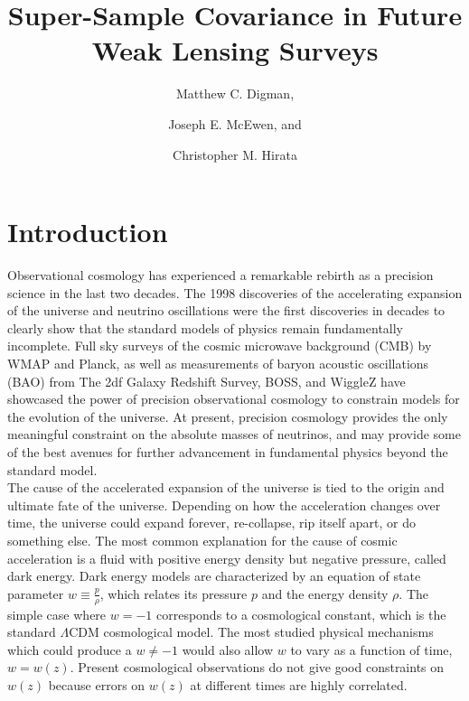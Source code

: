 \documentclass[a4paper,11pt]{article}
\title{\boldmath Super-Sample Covariance in Future Weak Lensing Surveys}
\author{Matthew C. Digman,}
\author{Joseph E. McEwen, and}
\author{Christopher M. Hirata}
\affiliation{Center for Cosmology and AstroParticle Physics, Department of Physics, The Ohio State University, 191 W Woodruff Ave, Columbus OH 43210, USA}
\begin{document}
\maketitle
\flushbottom

\section{Introduction}
\label{sec:intro} 
Observational cosmology has experienced a remarkable rebirth as a precision science in the last two decades. The 1998 discoveries of the accelerating expansion of the universe\cite{Perlmutter:1998np}\cite{Riess:1998cb} and neutrino oscillations\cite{Fukuda:1998mi} were the first discoveries in decades to clearly show that the standard models of physics remain fundamentally incomplete. Full sky surveys of the cosmic microwave background (CMB) by WMAP\cite{wmap1year}\cite{wmap9year} and Planck\cite{planck2015params}, as well as measurements of baryon acoustic oscillations (BAO) from The 2df Galaxy Redshift Survey\cite{2df2005}, BOSS\cite{boss2013}, and WiggleZ\cite{wigglez2012} have showcased the power of precision observational cosmology to constrain models for the evolution of the universe. At present, precision cosmology provides the only meaningful constraint on the absolute masses of neutrinos\cite{neutrinomasscosmology}, and may provide some of the best avenues for further advancement in fundamental physics beyond the standard model. 
\\
The cause of the accelerated expansion of the universe is tied to the origin and ultimate fate of the universe. Depending on how the acceleration changes over time, the universe could expand forever, re-collapse, rip itself apart, or do something else\cite{bigripcaldwell}\cite{fate_universe}. The most common explanation for the cause of cosmic acceleration is a fluid with positive energy density but negative pressure, called dark energy.  Dark energy models are characterized by an equation of state parameter $w\equiv \frac{p}{\rho}$, which relates its pressure $p$ and the energy density $\rho$\cite{constraining_de}. The simple case where $w=-1$ corresponds to a cosmological constant, which is the standard $\Lambda$CDM cosmological model. The most studied physical mechanisms which could produce a $w\neq-1$ would also allow $w$ to vary as a function of time, $w=w(z)$\cite{quintessence_caldwell}. Present cosmological observations do not give good constraints on $w(z)$ because errors on $w(z)$ at different times are highly correlated\cite{weinberg_probes}\cite{eos_pitfalls}. 
\end{document}
